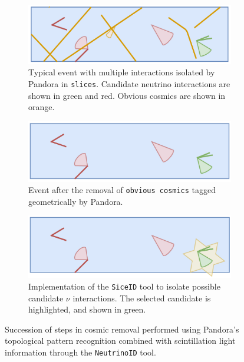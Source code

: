 \begin{figure}[ht] 
\begin{center}
    \begin{subfigure}[b]{0.7\textwidth}
    \centering
    \includegraphics[width=1.00\textwidth]{NuId-Ch3/Images/slice00.png}
    \caption{\label{fig:slcieid:00} Typical event with multiple interactions isolated by Pandora in \texttt{slices}. Candidate neutrino interactions are shown in green and red.  Obvious cosmics are shown in orange.}
    \end{subfigure}
    \begin{subfigure}[b]{0.7\textwidth}
    \centering
    \includegraphics[width=1.00\textwidth]{NuId-Ch3/Images/slice01.png}
    \caption{\label{fig:slcieid:01} Event after the removal of \texttt{obvious cosmics} tagged geometrically by Pandora.}
    \end{subfigure}
    \begin{subfigure}[b]{0.7\textwidth}
    \centering
    \includegraphics[width=1.00\textwidth]{NuId-Ch3/Images/slice02.png}
    \caption{\label{fig:slcieid:02} Implementation of the \texttt{SiceID} tool to isolate possible candidate $\nu$ interactions.  The selected candidate is highlighted, and shown in green.}
    \end{subfigure}
\caption{\label{fig:sliceid} Succession of steps in cosmic removal performed using Pandora's topological pattern recognition combined with scintillation light information through the \texttt{NeutrinoID} tool.}
\end{center}
\end{figure}

